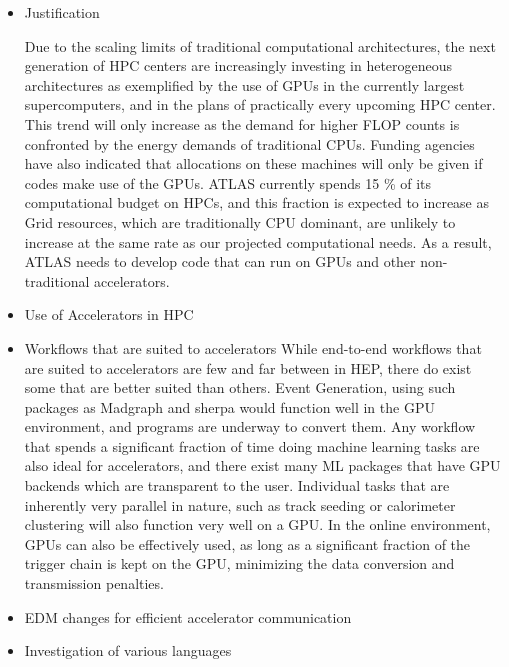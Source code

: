 \begin{itemize}
\item Justification

Due to the scaling limits of traditional computational
architectures, the next generation of HPC centers are
increasingly investing in heterogeneous architectures as
exemplified by the use of GPUs in the currently largest
supercomputers, and in the plans of practically every upcoming HPC
center. This trend will only increase as
the demand for higher FLOP counts is confronted by the energy
demands of traditional CPUs. Funding agencies have also indicated
that allocations on these machines will only be given if codes
make use of the GPUs. ATLAS currently spends 15 \% of its
computational budget on HPCs, and this fraction is expected to
increase as Grid resources, which are traditionally CPU dominant,
are unlikely to increase at the same rate as our projected
computational needs. As a result, ATLAS needs to develop
code that can run on GPUs and other non-traditional accelerators.

\item Use of Accelerators in HPC

\item Workflows that are suited to accelerators
While end-to-end workflows that are suited to accelerators are
few and far between in HEP, there do exist some that are better
suited than others. Event Generation, using such packages as
Madgraph and sherpa would function well in the GPU environment, and
programs are underway to convert them. Any workflow that spends a 
significant fraction of time doing machine learning tasks are
also ideal for accelerators, and there exist many ML packages that
have GPU backends which are transparent to the user. Individual
tasks that are inherently very parallel in nature, such as track
seeding or calorimeter clustering will also function very well
on a GPU. In the online
environment, GPUs can also be effectively used, as long as a
significant fraction of the trigger chain is kept on the GPU, 
minimizing the data conversion and transmission penalties.

\item EDM changes for efficient accelerator communication

\item Investigation of various languages


\end{itemize}
